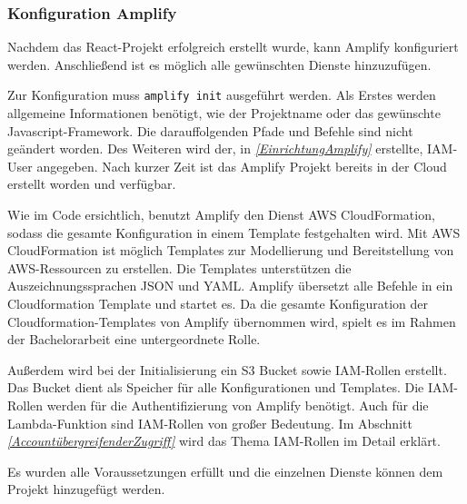 \subsubsection{Konfiguration Amplify}

Nachdem das React-Projekt erfolgreich erstellt wurde, kann Amplify konfiguriert werden.
Anschließend ist es möglich alle gewünschten Dienste hinzuzufügen.

Zur Konfiguration muss \verb+amplify init+ ausgeführt werden.
Als Erstes werden allgemeine Informationen benötigt, wie der Projektname oder das gewünschte Javascript-Framework.
Die darauffolgenden Pfade und Befehle sind nicht geändert worden.
Des Weiteren wird der, in \textit{\ref{EinrichtungAmplify} } erstellte, IAM-User angegeben.
Nach kurzer Zeit ist das Amplify Projekt bereits in der Cloud erstellt worden und verfügbar.

Wie im Code ersichtlich, benutzt Amplify den Dienst AWS CloudFormation, sodass die gesamte Konfiguration in einem Template festgehalten wird.
Mit AWS CloudFormation ist möglich Templates zur Modellierung und Bereitstellung von AWS-Ressourcen zu erstellen.
Die Templates unterstützen die Auszeichnungssprachen JSON und YAML.
Amplify übersetzt alle Befehle in ein Cloudformation Template und startet es.
Da die gesamte Konfiguration der Cloudformation-Templates von Amplify übernommen wird, spielt es im Rahmen der Bachelorarbeit eine untergeordnete Rolle.

Außerdem wird bei der Initialisierung ein S3 Bucket sowie IAM-Rollen erstellt.
Das Bucket dient als Speicher für alle Konfigurationen und Templates.
Die IAM-Rollen werden für die Authentifizierung von Amplify benötigt.
Auch für die Lambda-Funktion sind IAM-Rollen von großer Bedeutung.
Im Abschnitt \textit{\ref{AccountübergreifenderZugriff} } wird das Thema IAM-Rollen im Detail erklärt.

Es wurden alle Voraussetzungen erfüllt und die einzelnen Dienste können dem Projekt hinzugefügt werden.

\clearpage

